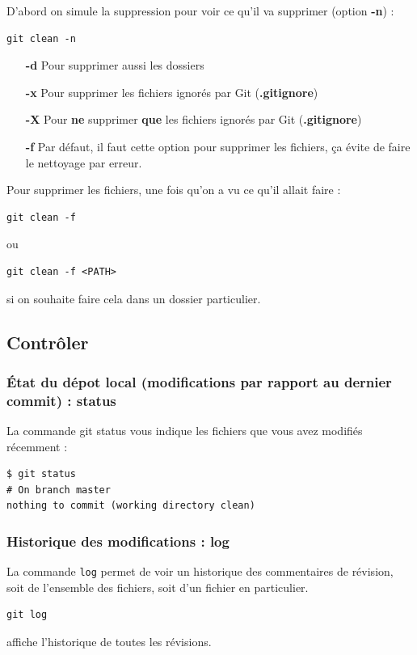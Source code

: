 \documentclass[a4paper,twoside]{article}
\begin{document}
D'abord on simule la suppression pour voir ce qu'il va supprimer (option \textbf{-n}) :
\begin{verbatim}
git clean -n
\end{verbatim}

\begin{itemize}
\item[\textbf{-d}] Pour supprimer aussi les dossiers
\item[\textbf{-x}] Pour supprimer les fichiers ignorés par Git (\textbf{.gitignore})
\item[\textbf{-X}] Pour \textbf{ne} supprimer \textbf{que} les fichiers ignorés par Git (\textbf{.gitignore})
\item[\textbf{-f}] Par défaut, il faut cette option pour supprimer les fichiers, ça évite de faire le nettoyage par erreur.
\end{itemize}

Pour supprimer les fichiers, une fois qu'on a vu ce qu'il allait faire :
\begin{verbatim}
git clean -f
\end{verbatim}
ou
\begin{verbatim}
git clean -f <PATH>
\end{verbatim}
si on souhaite faire cela dans un dossier particulier.


\subsection{Contrôler}
\subsubsection{État du dépot local (modifications par rapport au dernier commit) : status}
La commande git status vous indique les fichiers que vous avez modifiés récemment :
\begin{verbatim}
$ git status
# On branch master
nothing to commit (working directory clean)
\end{verbatim}

\subsubsection{Historique des modifications : log}
La commande \texttt{log} permet de voir un historique des commentaires de révision, soit de l'ensemble des fichiers, soit d'un fichier en particulier.

\begin{verbatim}
git log
\end{verbatim}
affiche l'historique de toutes les révisions.
\end{document}
